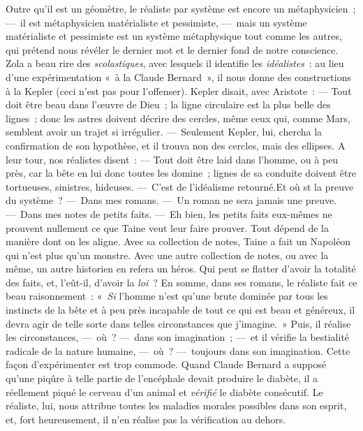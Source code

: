 \documentclass[french,twoside]{book} %
\begin{document}
Outre qu’il est un géomètre, le réaliste par système est encore un métaphysicien ; — il est métaphysicien matérialiste et pessimiste, — mais un système matérialiste et pessimiste est un système métaphysique tout comme les autres, qui prétend nous révéler le dernier mot et le dernier fond de notre conscience. Zola a beau rire des \emph{scolastiques}, avec lesquels il identifie les \emph{idéalistes} : au lieu d’une expérimentation « à la Claude Bernard », il nous donne des constructions à la Kepler (ceci n’est pas pour l’offenser). Kepler disait, avec Aristote : — Tout doit être beau dans l’œuvre de Dieu ; la ligne circulaire est la plus belle des lignes ; donc les astres doivent décrire des cercles, même ceux qui, comme Mars, semblent avoir un trajet si irrégulier. — Seulement Kepler, lui, chercha la confirmation de son hypothèse, et il trouva non des cercles, mais des ellipses. A leur tour, nos réalistes disent : — Tout doit être laid dans l’homme, ou à peu près, car la bête en lui donc toutes les domine ; lignes de sa conduite doivent être tortueuses, sinistres, hideuses. — C’est de l’idéalisme retourné.Et où st la preuve du système ? — Dans mes romans. — Un roman ne sera jamais une preuve. — Dans mes notes de petits faits. — Eh bien, les petits faits eux-mêmes ne prouvent nullement ce que Taine veut leur faire prouver. Tout dépend de la manière dont on les aligne. Avec sa collection de notes, Taine a fait un Napoléon qui n’est plus qu’un monstre. Avec une autre collection de notes, ou avec la même, un autre historien en refera un héros. Qui peut se flatter d’avoir la totalité des faits, et, l’eût-il, d’avoir la \emph{loi} ? En somme, dans ses romans, le réaliste fait ce beau raisonnement : « \emph{Si} l’homme n’est qu’une brute dominée par tous les instincts de la bête et à peu près incapable de tout ce qui est beau et généreux, il devra agir de telle sorte dans telles circonstances que j’imagine. » Puis, il réalise les circonstances, — où ? — dans son imagination ; — et il vérifie la bestialité radicale de la nature humaine, — où ? — toujours dans son imagination. Cette façon d’expérimenter est trop commode. Quand Claude Bernard a supposé qu’une piqûre à telle partie de l’encéphale devait produire le diabète, il a réellement piqué le cerveau d’un animal et \emph{vérifié} le diabète consécutif. Le réaliste, lui, nous attribue toutes les maladies morales possibles dans son esprit, et, fort heureusement, il n’en réalise pas la vérification au dehors.\par
\end{document}
